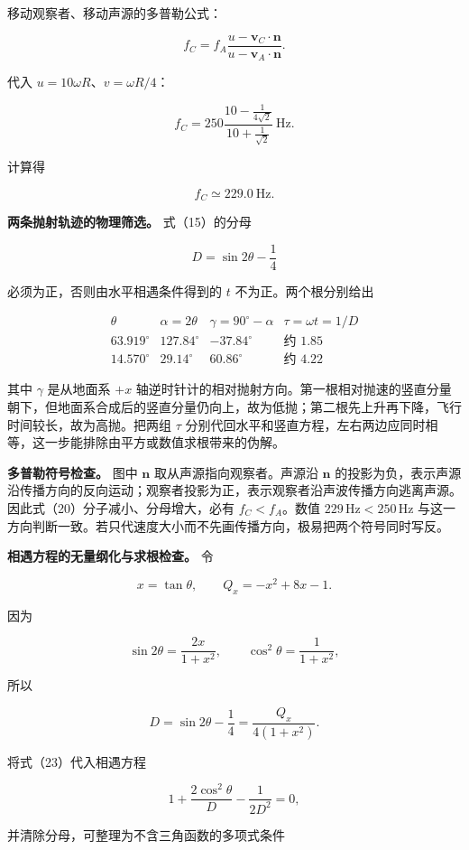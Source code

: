 \documentclass[12pt,a4paper,UTF8]{ctexart}
\begin{document}
移动观察者、移动声源的多普勒公式：

\[
f_C=f_A
\frac{u-\bm v_C\cdot\bm n}
{u-\bm v_A\cdot\bm n}. \tag{20}
\]

代入 \(u=10\omega R\)、\(v=\omega R/4\)：

\[
f_C=250
\frac{10-\frac1{4\sqrt2}}
{10+\frac1{\sqrt2}}
\ \mathrm{Hz}.
\]

计算得

\[
\boxed{f_C\simeq229.0\ \mathrm{Hz}}. \tag{21}
\]

\textbf{两条抛射轨迹的物理筛选。} 式（15）的分母

\[
D=\sin2\theta-\frac14
\]

必须为正，否则由水平相遇条件得到的 \(t\) 不为正。两个根分别给出

\[
\begin{array}{c|c|c|c}
\theta & \alpha=2\theta & \gamma=90^\circ-\alpha & \tau=\omega t=1/D\\ \hline
63.919^\circ &127.84^\circ&-37.84^\circ&\text{约 }1.85\\
14.570^\circ &29.14^\circ&60.86^\circ&\text{约 }4.22
\end{array} \tag{22}
\]

其中 \(\gamma\) 是从地面系 \(+x\)
轴逆时针计的相对抛射方向。第一根相对抛速的竖直分量朝下，但地面系合成后的竖直分量仍向上，故为低抛；第二根先上升再下降，飞行时间较长，故为高抛。把两组
\(\tau\)
分别代回水平和竖直方程，左右两边应同时相等，这一步能排除由平方或数值求根带来的伪解。

\textbf{多普勒符号检查。} 图中 \(\bm n\) 取从声源指向观察者。声源沿
\(\bm n\)
的投影为负，表示声源沿传播方向的反向运动；观察者投影为正，表示观察者沿声波传播方向逃离声源。因此式（20）分子减小、分母增大，必有
\(f_C<f_A\)。数值 \(229\,\mathrm{Hz}<250\,\mathrm{Hz}\)
与这一方向判断一致。若只代速度大小而不先画传播方向，极易把两个符号同时写反。

\textbf{相遇方程的无量纲化与求根检查。} 令

\[
x=\tan\theta,
\qquad
Q_x=-x^2+8x-1.
\]

因为

\[
\sin2\theta=\frac{2x}{1+x^2},
\qquad
\cos^2\theta=\frac1{1+x^2},
\]

所以

\[
D=\sin2\theta-\frac14
=\frac{Q_x}{4(1+x^2)}. \tag{23}
\]

将式（23）代入相遇方程

\[
1+\frac{2\cos^2\theta}{D}-\frac1{2D^2}=0,
\]

并清除分母，可整理为不含三角函数的多项式条件
\end{document}
